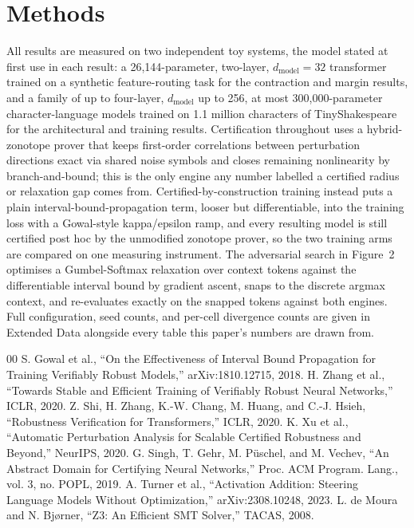 \documentclass[sn-nature,pdflatex]{sn-jnl}
\begin{document}
\section{Methods}

All results are measured on two independent toy systems, the model stated at first use in each result: a 26,144-parameter, two-layer, $d_{\text{model}}=32$ transformer trained on a synthetic feature-routing task for the contraction and margin results, and a family of up to four-layer, $d_{\text{model}}$ up to 256, at most 300,000-parameter character-language models trained on 1.1 million characters of TinyShakespeare for the architectural and training results. Certification throughout uses a hybrid-zonotope prover that keeps first-order correlations between perturbation directions exact via shared noise symbols and closes remaining nonlinearity by branch-and-bound; this is the only engine any number labelled a certified radius or relaxation gap comes from. Certified-by-construction training instead puts a plain interval-bound-propagation term, looser but differentiable, into the training loss with a Gowal-style kappa/epsilon ramp, and every resulting model is still certified post hoc by the unmodified zonotope prover, so the two training arms are compared on one measuring instrument. The adversarial search in Figure~2 optimises a Gumbel-Softmax relaxation over context tokens against the differentiable interval bound by gradient ascent, snaps to the discrete argmax context, and re-evaluates exactly on the snapped tokens against both engines. Full configuration, seed counts, and per-cell divergence counts are given in Extended Data alongside every table this paper's numbers are drawn from.

\begin{thebibliography}{00}
 S. Gowal et al., ``On the Effectiveness of Interval Bound Propagation for Training Verifiably Robust Models,'' arXiv:1810.12715, 2018.
 H. Zhang et al., ``Towards Stable and Efficient Training of Verifiably Robust Neural Networks,'' ICLR, 2020.
 Z. Shi, H. Zhang, K.-W. Chang, M. Huang, and C.-J. Hsieh, ``Robustness Verification for Transformers,'' ICLR, 2020.
 K. Xu et al., ``Automatic Perturbation Analysis for Scalable Certified Robustness and Beyond,'' NeurIPS, 2020.
 G. Singh, T. Gehr, M. P{\"u}schel, and M. Vechev, ``An Abstract Domain for Certifying Neural Networks,'' Proc. ACM Program. Lang., vol. 3, no. POPL, 2019.
 A. Turner et al., ``Activation Addition: Steering Language Models Without Optimization,'' arXiv:2308.10248, 2023.
 L. de Moura and N. Bj{\o}rner, ``Z3: An Efficient SMT Solver,'' TACAS, 2008.
\end{thebibliography}
\end{document}
